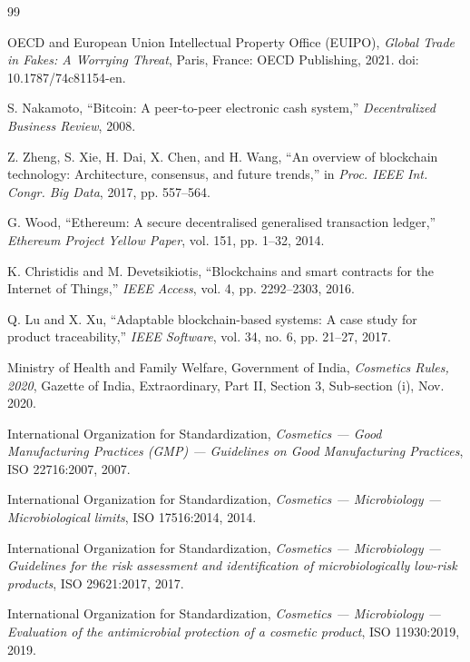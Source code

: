 \documentclass[12pt,a4paper]{report}
\begin{document}
\begin{thebibliography}{99}
\small
\setlength{\itemsep}{1.5pt}
\setlength{\parsep}{0pt}

 OECD and European Union Intellectual Property Office (EUIPO), \textit{Global Trade in Fakes: A Worrying Threat}, Paris, France: OECD Publishing, 2021. doi: 10.1787/74c81154-en.

 S. Nakamoto, ``Bitcoin: A peer-to-peer electronic cash system,'' \textit{Decentralized Business Review}, 2008.

 Z. Zheng, S. Xie, H. Dai, X. Chen, and H. Wang, ``An overview of blockchain technology: Architecture, consensus, and future trends,'' in \textit{Proc. IEEE Int. Congr. Big Data}, 2017, pp. 557--564.

 G. Wood, ``Ethereum: A secure decentralised generalised transaction ledger,'' \textit{Ethereum Project Yellow Paper}, vol. 151, pp. 1--32, 2014.

 K. Christidis and M. Devetsikiotis, ``Blockchains and smart contracts for the Internet of Things,'' \textit{IEEE Access}, vol. 4, pp. 2292--2303, 2016.

 Q. Lu and X. Xu, ``Adaptable blockchain-based systems: A case study for product traceability,'' \textit{IEEE Software}, vol. 34, no. 6, pp. 21--27, 2017.

 Ministry of Health and Family Welfare, Government of India, \textit{Cosmetics Rules, 2020}, Gazette of India, Extraordinary, Part II, Section 3, Sub-section (i), Nov. 2020.

 International Organization for Standardization, \textit{Cosmetics --- Good Manufacturing Practices (GMP) --- Guidelines on Good Manufacturing Practices}, ISO 22716:2007, 2007.

 International Organization for Standardization, \textit{Cosmetics --- Microbiology --- Microbiological limits}, ISO 17516:2014, 2014.

 International Organization for Standardization, \textit{Cosmetics --- Microbiology --- Guidelines for the risk assessment and identification of microbiologically low-risk products}, ISO 29621:2017, 2017.

 International Organization for Standardization, \textit{Cosmetics --- Microbiology --- Evaluation of the antimicrobial protection of a cosmetic product}, ISO 11930:2019, 2019.


\end{thebibliography}
\end{document}
